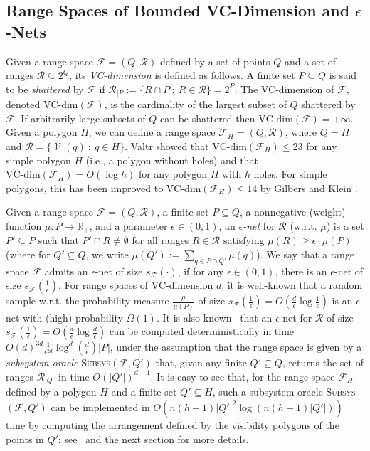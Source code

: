 \documentclass[a4paper,11pt]{article}
\def\RR{\mathbb R}
\def\cF{\mathcal F}
\def\cR{\mathcal R}
\def\cV{\mathcal V}
\newcommand{\Vis}{\operatorname{\cV}}
\def \VCd {\text{VC-dim}}
\def \SO {\textsc{Subsys}}
\begin{document}
\subsection{Range Spaces of Bounded VC-Dimension and $\epsilon$-Nets}\label{sec:VCd}
Given a range space $\cF=(Q,\cR)$ defined by a set of points $Q$ and a set of ranges $\cR\subseteq 2^Q$, its  {\it VC-dimension} is defined as follows. A finite set $P\subseteq Q$ is said to be {\it shattered} by $\cF$ if $\cR_{|P}:=\{R\cap P~:~R\in\cR\}=2^P$. The VC-dimension of $\cF$, denoted $\VCd(\cF)$, is the cardinality of the largest subset of $Q$ shattered by $\cF$. If arbitrarily large subsets of $Q$ can be shattered then $\VCd(\cF)=+\infty$. Given a polygon $H$, we can define a range space $\cF_H=(Q,\cR)$, where $Q=H$ and $\cR=\{\Vis(q)~:~q\in H\}$. Valtr \cite{V98} showed that $\VCd(\cF_H)\le 23$ for any simple polygon $H$ (i.e., a polygon without holes) and that $\VCd(\cF_H)=O(\log h)$ for any polygon $H$ with $h$ holes. For simple polygons, this has been improved to $\VCd(\cF_H)\le 14$ by Gilbers and Klein \cite{GK14}.                                                         

Given a range space $\cF=(Q,\cR)$, a finite set $P\subseteq Q$, a nonnegative (weight) function $\mu:P\to\RR_+$, and a parameter $\epsilon\in(0,1)$, an {\it $\epsilon$-net} for $\cR$ (w.r.t. $\mu$) is a set $P'\subseteq P$ such that $P'\cap R\neq\emptyset$ for all ranges $R\in\cR$ satisfying $\mu(R)\ge\epsilon\cdot\mu(P)$ (where for $Q'\subseteq Q$, we write $\mu(Q'):=\sum_{q\in P\cap Q'}\mu(q)$). 
We say that a range space $\cF$ admits an $\epsilon$-net of size $s_{\cF}(\cdot)$, if for any $\epsilon\in(0,1)$, there is an $\epsilon$-net of size $s_{\cF}(\frac{1}{\epsilon})$. For range spaces of VC-dimension $d$, it is well-known \cite{HW87,KPW92} that a random sample w.r.t. the probability measure $\frac{\mu}{\mu(P)}$ of size $s_{\cF}(\frac{1}{\epsilon})=O(\frac{d}{\epsilon}\log\frac{1}{\epsilon})$ is an $\epsilon$-net with (high) probability $\Omega(1)$. 
It is also known~\cite{BCM99,CM96,M91} that an $\epsilon$-net for $\cR$ of size $s_{\cF}(\frac{1}{\epsilon})=O(\frac{d}{\epsilon}\log\frac{d}{\epsilon})$
can be computed deterministically in time $O(d)^{3d}\frac{1}{\epsilon^{2d}}\log^d(\frac{d}{\epsilon})|P|$, under the assumption that 
the range space is given by a {\it subsystem oracle} \SO$(\cF,Q')$ that, given any finite $Q'\subseteq Q$, returns the set of ranges $\cR_{|Q'}$ in time $O(|Q'|)^{d+1}$.  It is easy to see that, for the range space $\cF_H$ defined by a polygon $H$ and  a finite set $Q'\subseteq H$, such a subsystem oracle \SO$(\cF,Q')$  can be implemented in $O(n(h+1)|Q'|^2\log(n(h+1)|Q'|))$ time  by computing the arrangement defined by the visibility polygons of the points in $Q'$; see~\cite{EH06} and the next section for more details. 
\end{document}
